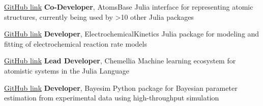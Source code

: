     {\href{https://github.com/https://github.com/JuliaMolSim/AtomsBase.jl}{GitHub link}}
    {\textbf{Co-Developer}, AtomsBase}
    {Julia interface for representing atomic structures, currently being used by >10 other Julia packages}

\vspace{-3mm}
    {\href{https://github.com/BattModels/ElectrochemicalKinetics.jl}{GitHub link}}
    {\textbf{Developer}, ElectrochemicalKinetics}
    {Julia package for modeling and fitting of electrochemical reaction rate models}

\vspace{-3mm}
    {\href{https://github.com/Chemellia}{GitHub link}}
    {\textbf{Lead Developer}, Chemellia}
    {Machine learning ecosystem for atomistic systems in the Julia Language}

\vspace{-3mm}
    {\href{https://github.com/PV-Lab/bayesim}{GitHub link}}
    {\textbf{Developer}, Bayesim}
    {Python package for Bayesian parameter estimation from experimental data using high-throughput simulation}
